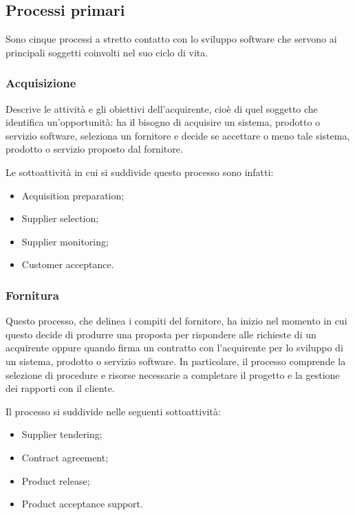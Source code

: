 \subsection{Processi primari}
Sono cinque processi a stretto contatto con lo sviluppo software che servono ai principali soggetti coinvolti nel suo ciclo di vita.
\subsubsection{Acquisizione}
Descrive le attività e gli obiettivi dell'acquirente, cioè di quel soggetto che identifica un'opportunità: ha il bisogno di acquisire un sistema, prodotto o servizio software, seleziona un fornitore e decide se accettare o meno tale sistema, prodotto o servizio proposto dal fornitore.
\par Le sottoattività in cui si suddivide questo processo sono infatti:
\begin{itemize}
    \item Acquisition preparation;
    \item Supplier selection;
    \item Supplier monitoring;
    \item Customer acceptance.
\end{itemize}
\subsubsection{Fornitura}
Questo processo, che delinea i compiti del fornitore, ha inizio nel momento in cui questo decide di produrre una proposta per rispondere alle richieste di un acquirente oppure quando firma un contratto con l'acquirente per lo sviluppo di un sistema, prodotto o servizio software. In particolare, il processo comprende la selezione di procedure e risorse necessarie a completare il progetto e la gestione dei rapporti con il cliente.
\par Il processo si suddivide nelle seguenti sottoattività:
\begin{itemize}
    \item Supplier tendering;
    \item Contract agreement;
    \item Product release;
    \item Product acceptance support.
\end{itemize}

